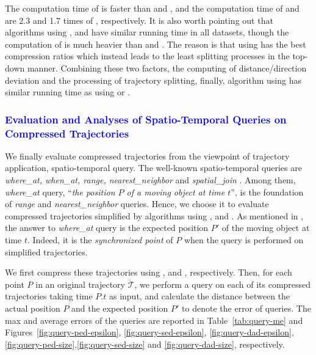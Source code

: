 The computation time of \dad is faster than \ped and \sed, and the computation time of \ped and \sed are 2.3 and 1.7 times of \dad, respectively.
{It is also worth pointing out that algorithms \dpa using \ped, \sed and \dad have similar running time in all datasets, though the computation of \ped is much heavier than \sed and \dad. The reason is that \dpa using \ped has the best compression ratios which instead leads to the least splitting processes in the top-down manner. Combining these two factors, \ie the computing of distance/direction deviation and the processing of trajectory splitting, finally, algorithm \dpa using \ped has similar running time as \dpa using \dad or \sed.}

\subsubsection{\textcolor{blue}{Evaluation and Analyses of Spatio-Temporal Queries on Compressed Trajectories}}
{We finally evaluate compressed trajectories from the viewpoint of trajectory application, \ie spatio-temporal query. The well-known spatio-temporal queries are \emph{where\_at, when\_at, range, nearest\_neighbor} and \emph{spatial\_join} \cite{Cao:Spatio}. Among them, \emph{where\_at} query, \ie ``\emph{the position $P$ of a moving object at time $t$}'', is the foundation of \emph{range} and \emph{nearest\_neighbor} queries.}
{Hence, we choose it to evaluate compressed trajectories simplified by \lsa algorithms using \ped, \sed and \dad.
As mentioned in \cite{Cao:Spatio}, the answer to \emph{where\_at} query is the expected position $P'$ of the moving object at time $t$. Indeed, it is the \emph{synchronized point} of $P$ when the query is performed on simplified trajectories.}

{We first compress these trajectories using \ped, \sed and \dad, respectively. }
{Then, for each point $P$ in an original trajectory $\dddot{\mathcal{T}}$, we perform a query on each of its compressed trajectories taking time $P.t$ as input, and calculate the distance between the actual position $P$ and the expected position $P'$ to denote the error of queries.
}
%
{The max and average errors of the queries are reported in Table~\ref{tab:query-me} and Figures~\ref{fig:query-ped-epsilon}, \ref{fig:query-sed-epsilon}, \ref{fig:query-dad-epsilon}, \ref{fig:query-ped-size},\ref{fig:query-sed-size} and \ref{fig:query-dad-size}, respectively.}


